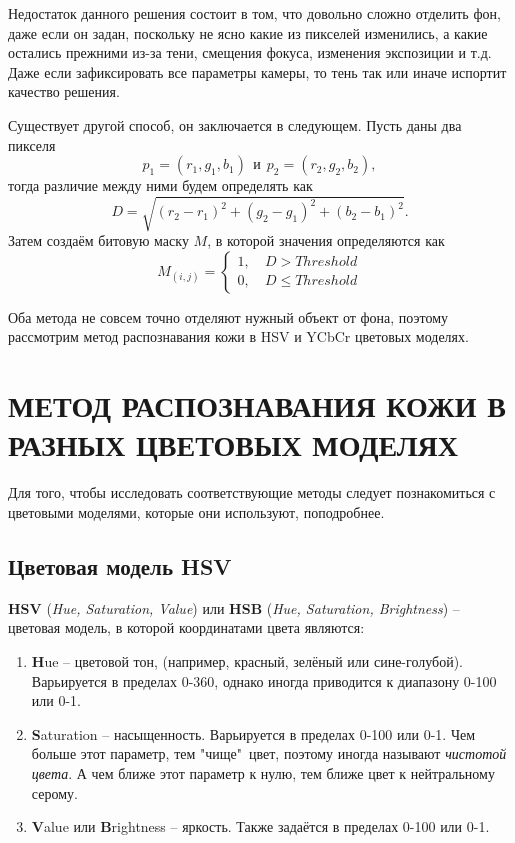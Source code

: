 Недостаток данного решения состоит в том, что довольно сложно отделить фон, даже если он задан,
поскольку не ясно какие из пикселей изменились, а какие остались прежними из-за тени, смещения
фокуса, изменения экспозиции и т.д. Даже если зафиксировать все параметры камеры, то тень так
или иначе испортит качество решения.

Существует другой способ, он заключается в следующем. 
Пусть даны два пикселя 
\begin{equation}
	p_1 = (r_1, g_1, b_1)~~и~~p_2 = (r_2, g_2, b_2),
	\label{pixels_bg}
\end{equation}
тогда различие между ними будем определять как
\begin{equation}
	D = \sqrt{(r_2 - r_1)^2 + (g_2 - g_1)^2 + (b_2 - b_1)^2}.
	\label{distance}
\end{equation}
Затем создаём битовую маску $M$, в которой значения определяются как
\begin{equation}
	M_{(i,j)}=\left\{\begin{aligned}
	1,~& D > Threshold\\
	0,~& D \leq Threshold
\end{aligned}\right. 
\label{bite-mask}
\end{equation}

Оба метода не совсем точно отделяют нужный объект от фона, поэтому 
рассмотрим метод распознавания кожи в HSV и YCbCr цветовых моделях.

\newpage

\section{МЕТОД РАСПОЗНАВАНИЯ КОЖИ В РАЗНЫХ ЦВЕТОВЫХ МОДЕЛЯХ}

Для того, чтобы исследовать соответствующие методы следует познакомиться
 с цветовыми моделями, которые они используют, поподробнее.

\subsection{Цветовая модель HSV}

{\bf HSV} ({\it Hue, Saturation, Value}) или {\bf HSB} ({\it Hue, Saturation, Brightness}) --
цветовая модель, в которой координатами цвета являются:
\begin{enumerate}
	\item {\bf H}ue -- цветовой тон, (например, красный, зелёный или сине-голубой). Варьируется 
в пределах 0-360\textdegree, однако иногда приводится к диапазону 0-100 или 0-1.
	\item {\bf S}aturation -- насыщенность. Варьируется в пределах 0-100 или 0-1. Чем больше
этот параметр, тем "чище"\ цвет, поэтому иногда называют {\it чистотой цвета}. А чем ближе этот
параметр к нулю, тем ближе цвет к нейтральному серому.
	\item {\bf V}alue или {\bf B}rightness -- яркость. Также задаётся в пределах 0-100 или 0-1.
\end{enumerate}

